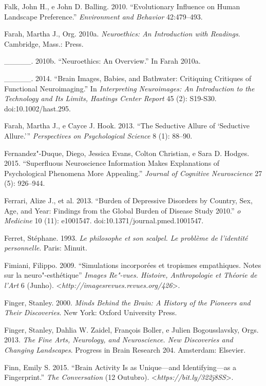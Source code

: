 {\begin{Parskip}
Falk, John H., e John D. Balling. 2010. ``Evolutionary Influence on
Human Landscape Preference.'' \emph{Environment and Behavior}
42:479--493.

Farah, Martha J., Org. 2010a. \emph{Neuroethics: An Introduction with
Readings}. Cambridge, Mass.:  Press.

\_\_\_\_\_. 2010b. ``Neuroethics: An Overview.'' In Farah 2010a.

\_\_\_\_\_. 2014. ``Brain Images, Babies, and Bathwater: Critiquing
Critiques of Functional Neuroimaging.'' In \emph{Interpreting
Neuroimages: An Introduction to the Technology and Its Limits, Hastings
Center Report} 45 (2): S19-S30. doi:10.1002/hast.295.

Farah, Martha J., e Cayce J. Hook. 2013. ``The Seductive Allure of
`Seductive Allure.''' \emph{Perspectives on Psychological Science} 8
(1): 88--90.

Fernandez"-Duque, Diego, Jessica Evans, Colton Christian, e Sara D.
Hodges. 2015. ``Superfluous Neuroscience Information Makes Explanations
of Psychological Phenomena More Appealing.'' \emph{Journal of Cognitive
Neuroscience} 27 (5): 926--944.

Ferrari, Alize J., et al. 2013. ``Burden of Depressive Disorders by
Country, Sex, Age, and Year: Findings from the Global Burden of Disease
Study 2010.'' \emph{o Medicine} 10 (11): e1001547.
doi:10.1371/journal.pmed.1001547.

Ferret, Stéphane. 1993. \emph{Le philosophe et son scalpel. Le problème
de l'identité personnelle}. Paris: Minuit.

Fimiani, Filippo. 2009. ``Simulations incorporées et tropismes
empathiques. Notes sur la neuro"-esthétique'' \emph{Images Re"-vues.
Histoire, Anthropologie et Théorie de l'Art} 6 (Junho).
\textless{}\emph{http://imagesrevues.revues.org/426}\textgreater{}.

Finger, Stanley. 2000. \emph{Minds Behind the Brain: A History of the
Pioneers and Their Discoveries}. New York: Oxford University Press.

Finger, Stanley, Dahlia W. Zaidel, François Boller, e Julien
Bogousslavsky, Orgs. 2013. \emph{The Fine Arts, Neurology, and
Neuroscience. New Discoveries and Changing Landscapes}. Progress in
Brain Research 204. Amsterdam: Elsevier.

Finn, Emily S. 2015. ``Brain Activity Is as Unique---and
Identifying---as a Fingerprint.'' \emph{The Conversation} (12 Outubro).
\textless{}\emph{https://bit.ly/322j8SS}\textgreater{}.


\end{Parskip}}
